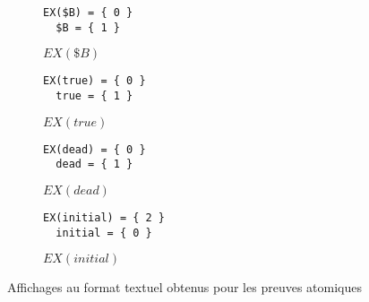 \begin{figure}[H]
\centering
\begin{subfigure}[b]{.24\textwidth}
\centering
\begin{minipage}{0.6\linewidth}
\begin{verbatim}
EX($B) = { 0 }
  $B = { 1 }
\end{verbatim}
\end{minipage}
\caption{$EX(\$B)$}
\end{subfigure}
\begin{subfigure}[b]{.24\textwidth}
\centering
\begin{minipage}{0.68\linewidth}
\begin{verbatim}
EX(true) = { 0 }
  true = { 1 }
\end{verbatim}
\end{minipage}
\caption{$EX(true)$}
\end{subfigure}
\begin{subfigure}[b]{.24\textwidth}
\centering
\begin{minipage}{0.68\linewidth}
\begin{verbatim}
EX(dead) = { 0 }
  dead = { 1 }
\end{verbatim}
\end{minipage}
\caption{$EX(dead)$}
\end{subfigure}
\begin{subfigure}[b]{.24\textwidth}
\centering
\begin{minipage}{0.78\linewidth}
\begin{verbatim}
EX(initial) = { 2 }
  initial = { 0 }
\end{verbatim}
\end{minipage}
\caption{$EX(initial)$}
\end{subfigure}
\caption{Affichages au format textuel obtenus pour les preuves atomiques}
\label{fig:PreuveAtomiqueTextuel}
\end{figure}